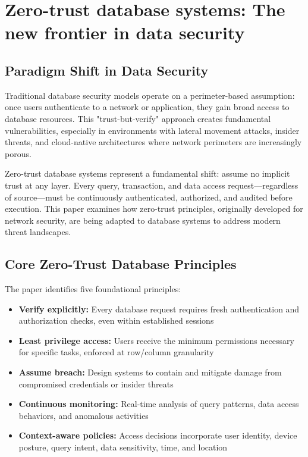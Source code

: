 \section{Zero-trust database systems: The new frontier in data security}

\subsection{Paradigm Shift in Data Security}

Traditional database security models operate on a perimeter-based assumption: once users authenticate to a network or application, they gain broad access to database resources. This "trust-but-verify" approach creates fundamental vulnerabilities, especially in environments with lateral movement attacks, insider threats, and cloud-native architectures where network perimeters are increasingly porous.

Zero-trust database systems represent a fundamental shift: assume no implicit trust at any layer. Every query, transaction, and data access request—regardless of source—must be continuously authenticated, authorized, and audited before execution. This paper examines how zero-trust principles, originally developed for network security, are being adapted to database systems to address modern threat landscapes.

\subsection{Core Zero-Trust Database Principles}

The paper identifies five foundational principles:

\begin{itemize}
    \item \textbf{Verify explicitly:} Every database request requires fresh authentication and authorization checks, even within established sessions
    \item \textbf{Least privilege access:} Users receive the minimum permissions necessary for specific tasks, enforced at row/column granularity
    \item \textbf{Assume breach:} Design systems to contain and mitigate damage from compromised credentials or insider threats
    \item \textbf{Continuous monitoring:} Real-time analysis of query patterns, data access behaviors, and anomalous activities
    \item \textbf{Context-aware policies:} Access decisions incorporate user identity, device posture, query intent, data sensitivity, time, and location
\end{itemize}


